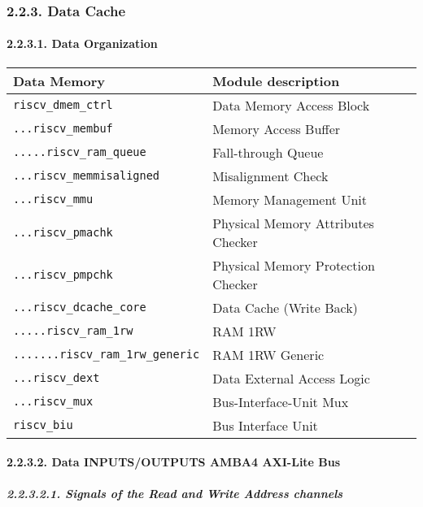 \documentclass[]{article}
\let\oldparagraph\paragraph
\renewcommand{\paragraph}[1]{\oldparagraph{#1}\mbox{}}
\let\oldsubparagraph\subparagraph
\renewcommand{\subparagraph}[1]{\oldsubparagraph{#1}\mbox{}}
\begin{document}
\hypertarget{data-cache}{%
\subsubsection{2.2.3. Data Cache}\label{data-cache}}

\hypertarget{data-organization}{%
\paragraph{2.2.3.1. Data Organization}\label{data-organization}}

\begin{longtable}[]{@{}ll@{}}
\toprule
Data Memory & Module description\tabularnewline
\midrule
\endhead
\texttt{riscv\_dmem\_ctrl} & Data Memory Access Block\tabularnewline
\texttt{...riscv\_membuf} & Memory Access Buffer\tabularnewline
\texttt{.....riscv\_ram\_queue} & Fall-through Queue\tabularnewline
\texttt{...riscv\_memmisaligned} & Misalignment Check\tabularnewline
\texttt{...riscv\_mmu} & Memory Management Unit\tabularnewline
\texttt{...riscv\_pmachk} & Physical Memory Attributes
Checker\tabularnewline
\texttt{...riscv\_pmpchk} & Physical Memory Protection
Checker\tabularnewline
\texttt{...riscv\_dcache\_core} & Data Cache (Write Back)\tabularnewline
\texttt{.....riscv\_ram\_1rw} & RAM 1RW\tabularnewline
\texttt{.......riscv\_ram\_1rw\_generic} & RAM 1RW
Generic\tabularnewline
\texttt{...riscv\_dext} & Data External Access Logic\tabularnewline
\texttt{...riscv\_mux} & Bus-Interface-Unit Mux\tabularnewline
\texttt{riscv\_biu} & Bus Interface Unit\tabularnewline
\bottomrule
\end{longtable}

\hypertarget{data-inputsoutputs-amba4-axi-lite-bus}{%
\paragraph{2.2.3.2. Data INPUTS/OUTPUTS AMBA4 AXI-Lite
Bus}\label{data-inputsoutputs-amba4-axi-lite-bus}}

\hypertarget{signals-of-the-read-and-write-address-channels-1}{%
\subparagraph{2.2.3.2.1. Signals of the Read and Write Address
channels}\label{signals-of-the-read-and-write-address-channels-1}}
\end{document}
